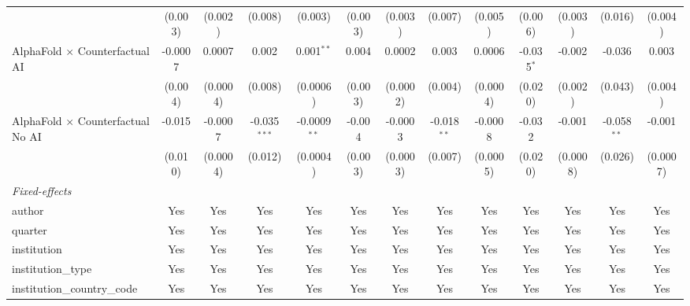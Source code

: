 \begin{tabular}{lcccccccccccc}
                                            & (0.003)       & (0.002)      & (0.008)        & (0.003)        & (0.003) & (0.003)       & (0.007)       & (0.005)      & (0.006)      & (0.003)  & (0.016)       & (0.004)\\   
   AlphaFold $\times$ Counterfactual AI     & -0.0007       & 0.0007       & 0.002          & 0.001$^{**}$   & 0.004   & 0.0002        & 0.003         & 0.0006       & -0.035$^{*}$ & -0.002   & -0.036        & 0.003\\   
                                            & (0.004)       & (0.0004)     & (0.008)        & (0.0006)       & (0.003) & (0.0002)      & (0.004)       & (0.0004)     & (0.020)      & (0.002)  & (0.043)       & (0.004)\\   
   AlphaFold $\times$ Counterfactual No AI  & -0.015        & -0.0007      & -0.035$^{***}$ & -0.0009$^{**}$ & -0.004  & -0.0003       & -0.018$^{**}$ & -0.0008      & -0.032       & -0.001   & -0.058$^{**}$ & -0.001\\   
                                            & (0.010)       & (0.0004)     & (0.012)        & (0.0004)       & (0.003) & (0.0003)      & (0.007)       & (0.0005)     & (0.020)      & (0.0008) & (0.026)       & (0.0007)\\   
   \midrule
   \emph{Fixed-effects}\\
   author                                   & Yes           & Yes          & Yes            & Yes            & Yes     & Yes           & Yes           & Yes          & Yes          & Yes      & Yes           & Yes\\  
   quarter                                  & Yes           & Yes          & Yes            & Yes            & Yes     & Yes           & Yes           & Yes          & Yes          & Yes      & Yes           & Yes\\  
   institution                              & Yes           & Yes          & Yes            & Yes            & Yes     & Yes           & Yes           & Yes          & Yes          & Yes      & Yes           & Yes\\  
   institution\_type                        & Yes           & Yes          & Yes            & Yes            & Yes     & Yes           & Yes           & Yes          & Yes          & Yes      & Yes           & Yes\\  
   institution\_country\_code               & Yes           & Yes          & Yes            & Yes            & Yes     & Yes           & Yes           & Yes          & Yes          & Yes      & Yes           & Yes\\  

\end{tabular}
